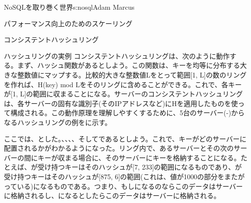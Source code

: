 \begin{aosachapter}{NoSQLを取り巻く世界}{s:nosql}{Adam Marcus}
\begin{aosasect1}{パフォーマンス向上のためのスケーリング}
\begin{aosasect2}{コンシステントハッシュリング}
\begin{aosasect3}{ハッシュリングの実例}
コンシステントハッシュリングは、次のように動作する。まず、ハッシュ関数があるとしよう。この関数は、キーを均等に分布する大きな整数値にマップする。比較的大きな整数値Lをとって範囲[1, L]の数のリングを作れば、H(key) mod Lをそのリングに含めることができる。これで、各キーが[1, L]の範囲に収まることになる。サーバーのコンシステントハッシュリングは、各サーバーの固有な識別子(そのIPアドレスなど)にHを適用したものを使って構成される。この動作原理を理解しやすくするために、5台のサーバー(-)からなるハッシュリングの例をに示す。

ここでは、とした。、、、、そしてであるとしよう。これで、キーがどのサーバーに配置されるかがわかるようになった。リング内で、あるサーバーとその次のサーバーの間にキーが収まる場合に、そのサーバーにキーを格納することになる。たとえば、が受け持つキーはそのハッシュが[7, 233]の範囲になるものであり、が受け持つキーはそのハッシュが[875, 6]の範囲(これは、値が1000の部分をまたがっている)になるものである。つまり、もしになるのならこのデータはサーバーに格納されるし、になるとしたらこのデータはサーバーに格納される。


\end{aosasect3}
\end{aosasect2}
\end{aosasect1}
\end{aosachapter}
